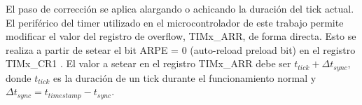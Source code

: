 
El paso de corrección se aplica alargando o achicando la duración del tick actual. El periférico del timer utilizado en el microcontrolador de este trabajo permite modificar el valor del registro de overflow, TIMx\_ARR, de forma directa. Esto se realiza a partir de setear el bit ARPE = 0 (auto-reload preload bit) en el registro TIMx\_CR1 \cite[p.~745]{RM0385}. El valor a setear en el registro TIMx\_ARR debe ser $t_{tick} + \Delta t_{sync}$, donde $t_{tick}$ es la duración de un tick durante el funcionamiento normal y $\Delta t_{sync} = t_{timestamp} - t_{sync}$.





